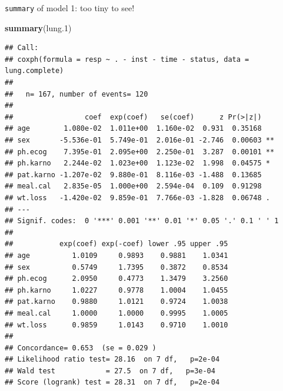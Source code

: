 \documentclass[ignorenonframetext,]{beamer}
\newenvironment{Shaded}{\begin{snugshade}}{\end{snugshade}}
\newcommand{\FloatTok}[1]{\textcolor[rgb]{0.00,0.00,0.81}{#1}}
\newcommand{\KeywordTok}[1]{\textcolor[rgb]{0.13,0.29,0.53}{\textbf{#1}}}
\newcommand{\NormalTok}[1]{#1}
\begin{document}
\begin{frame}[fragile]{\texttt{summary} of model 1: too tiny to see!}
\protect\hypertarget{summary-of-model-1-too-tiny-to-see}{}

\tiny

\begin{Shaded}
\begin{Highlighting}[]
\KeywordTok{summary}\NormalTok{(lung}\FloatTok{.1}\NormalTok{)}
\end{Highlighting}
\end{Shaded}

\begin{verbatim}
## Call:
## coxph(formula = resp ~ . - inst - time - status, data = lung.complete)
## 
##   n= 167, number of events= 120 
## 
##                 coef  exp(coef)   se(coef)      z Pr(>|z|)   
## age        1.080e-02  1.011e+00  1.160e-02  0.931  0.35168   
## sex       -5.536e-01  5.749e-01  2.016e-01 -2.746  0.00603 **
## ph.ecog    7.395e-01  2.095e+00  2.250e-01  3.287  0.00101 **
## ph.karno   2.244e-02  1.023e+00  1.123e-02  1.998  0.04575 * 
## pat.karno -1.207e-02  9.880e-01  8.116e-03 -1.488  0.13685   
## meal.cal   2.835e-05  1.000e+00  2.594e-04  0.109  0.91298   
## wt.loss   -1.420e-02  9.859e-01  7.766e-03 -1.828  0.06748 . 
## ---
## Signif. codes:  0 '***' 0.001 '**' 0.01 '*' 0.05 '.' 0.1 ' ' 1
## 
##           exp(coef) exp(-coef) lower .95 upper .95
## age          1.0109     0.9893    0.9881    1.0341
## sex          0.5749     1.7395    0.3872    0.8534
## ph.ecog      2.0950     0.4773    1.3479    3.2560
## ph.karno     1.0227     0.9778    1.0004    1.0455
## pat.karno    0.9880     1.0121    0.9724    1.0038
## meal.cal     1.0000     1.0000    0.9995    1.0005
## wt.loss      0.9859     1.0143    0.9710    1.0010
## 
## Concordance= 0.653  (se = 0.029 )
## Likelihood ratio test= 28.16  on 7 df,   p=2e-04
## Wald test            = 27.5  on 7 df,   p=3e-04
## Score (logrank) test = 28.31  on 7 df,   p=2e-04
\end{verbatim}

\normalsize

\end{frame}
\end{document}
